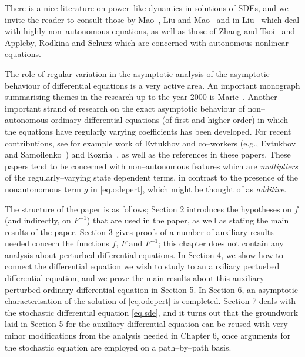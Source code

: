 \documentclass[a4paper,10pt,reqno]{amsart}
\numberwithin{equation}{section}
\theoremstyle{definition}
\theoremstyle{remark}
\DeclareMathOperator{\1}{\mathbbm 1}
\begin{document}
	There is a nice literature on power--like dynamics in solutions of SDEs, and we invite the reader to consult 
	those by Mao~\cite{MaoOx,Mao92}, Liu and Mao~\cite{LiuMao98,LiuMao:01a} and in Liu~\cite{Liu01} which deal with highly non--autonomous equations, as well 
	as those of Zhang and Tsoi~\cite{ZhangTsoi96, ZhangTsoi97} and Appleby, Rodkina and Schurz \cite{ARS06} which are concerned with autonomous nonlinear equations. 
	
	The role of regular variation in the asymptotic analysis of the asymptotic behaviour of differential equations is a very active area. An important monograph summarising themes in the research up to the year 2000 is Maric~\cite{Maric2000}. Another important strand of research on the exact asymptotic behaviour of non--autonomous ordinary differential equations (of first and higher order) in which the equations have regularly varying coefficients has been developed. For recent contributions, see for example work of Evtukhov and co--workers (e.g., Evtukhov and Samoilenko~\cite{EvSam:2011}) and Koz\'ma~\cite{Kozma:2012}, as well as the references in these papers. These papers tend to be concerned with non--autonomous features which are \emph{multipliers} of the regularly--varying state dependent terms, in contrast to the presence of the nonautonomous term $g$ in \eqref{eq.odepert}, which might be thought of as \emph{additive}. 
	
	The structure of the paper is as follows; Section 2 introduces the hypotheses on $f$ (and indirectly, on $F^{-1}$) that are used in the paper, as well as stating the main results of the paper. Section 3 gives proofs of a number of auxiliary results needed concern the functions $f$, $F$ and $F^{-1}$; this chapter  does not contain any analysis about perturbed differential equations. In Section 4, we show how to connect the differential equation we wish to study to an auxiliary pertuebed differential equation, and we prove the main results about this  auxiliary perturbed ordinary differential equation in Section 5. In Section 6, an asymptotic characterisation of the solution of \eqref{eq.odepert} is completed. Section 7 deals with the stochastic  differential equation \eqref{eq.sde}, and it turns out that the groundwork laid in Section 5 for the auxiliary differential equation can be reused with very minor modifications from the analysis needed in Chapter 6, once arguments for the stochastic equation are employed on a path--by--path basis.   
	
	
\end{document}
